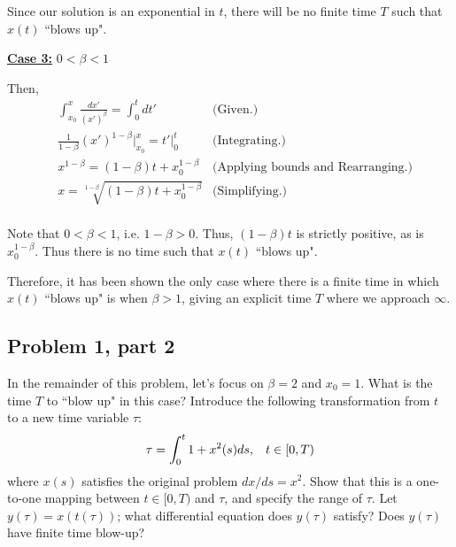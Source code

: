 \begin{solution}
Since our solution is an exponential in $t$, there will be no finite time $T$ such that $x(t)$ ``blows up".

\newpage
\underline{\textbf{Case 3:}} $0 < \beta < 1$

Then,
\begin{align}
    &\int_{x_0}^x \frac{dx'}{(x')^\beta} = \int_0^t dt' &\text{(Given.)}\nonumber\\
    &\frac{1}{1 - \beta}(x')^{1 - \beta}\bigg|_{x_0}^x = t' \bigg|_0^t &\text{(Integrating.)}\nonumber\\
    &x^{1 - \beta} = (1 - \beta)t + x_0^{1 - \beta} &\text{(Applying bounds and Rearranging.)} \nonumber\\
    &x = \sqrt[1 - \beta]{(1 - \beta)t + x_0^{1 - \beta}} &\text{(Simplifying.)}\nonumber\\
\end{align}

Note that $0 < \beta < 1$, i.e. $1 - \beta > 0$. Thus, $(1 - \beta)t$ is strictly positive, as is $x_0^{1 - \beta}$. Thus there is no time such that $x(t)$ ``blows up".

\alignbreak

Therefore, it has been shown the only case where there is a finite time in which $x(t)$ ``blows up" is when $\beta > 1$, giving an explicit time $T$ where we approach $\infty$.

\jump
\end{solution}%

\partbreak
\subsection{Problem 1, part 2}
In the remainder of this problem, let's focus on $\beta = 2$  and $x_0 = 1$. What is the time $T$ to ``blow up" in this case? Introduce the following transformation from $t$ to a new time variable $\tau$:
\[
\tau = \int_0^t 1 + x^2(s) ds, \hspace{3mm} t\in [0,T)
\]
where $x(s)$ satisfies the original problem $dx/ds = x^2$. Show that this is a one-to-one mapping between $t \in [0, T)$ and $\tau$, and specify the range of $\tau$. Let $y(\tau) = x(t(\tau))$; what differential equation does $y(\tau)$ satisfy? Does $y(\tau)$ have finite time blow-up? 

